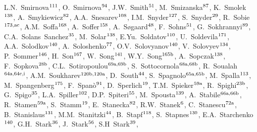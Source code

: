 \begin{flushleft}
L.N.~Smirnova$^\textrm{\scriptsize 111}$,    
O.~Smirnova$^\textrm{\scriptsize 94}$,    
J.W.~Smith$^\textrm{\scriptsize 51}$,    
M.~Smizanska$^\textrm{\scriptsize 87}$,    
K.~Smolek$^\textrm{\scriptsize 138}$,    
A.~Smykiewicz$^\textrm{\scriptsize 82}$,    
A.A.~Snesarev$^\textrm{\scriptsize 108}$,    
I.M.~Snyder$^\textrm{\scriptsize 127}$,    
S.~Snyder$^\textrm{\scriptsize 29}$,    
R.~Sobie$^\textrm{\scriptsize 173,ac}$,    
A.M.~Soffa$^\textrm{\scriptsize 168}$,    
A.~Soffer$^\textrm{\scriptsize 158}$,    
A.~S{\o}gaard$^\textrm{\scriptsize 48}$,    
F.~Sohns$^\textrm{\scriptsize 51}$,    
G.~Sokhrannyi$^\textrm{\scriptsize 89}$,    
C.A.~Solans~Sanchez$^\textrm{\scriptsize 35}$,    
M.~Solar$^\textrm{\scriptsize 138}$,    
E.Yu.~Soldatov$^\textrm{\scriptsize 110}$,    
U.~Soldevila$^\textrm{\scriptsize 171}$,    
A.A.~Solodkov$^\textrm{\scriptsize 140}$,    
A.~Soloshenko$^\textrm{\scriptsize 77}$,    
O.V.~Solovyanov$^\textrm{\scriptsize 140}$,    
V.~Solovyev$^\textrm{\scriptsize 134}$,    
P.~Sommer$^\textrm{\scriptsize 146}$,    
H.~Son$^\textrm{\scriptsize 167}$,    
W.~Song$^\textrm{\scriptsize 141}$,    
W.Y.~Song$^\textrm{\scriptsize 165b}$,    
A.~Sopczak$^\textrm{\scriptsize 138}$,    
F.~Sopkova$^\textrm{\scriptsize 28b}$,    
C.L.~Sotiropoulou$^\textrm{\scriptsize 69a,69b}$,    
S.~Sottocornola$^\textrm{\scriptsize 68a,68b}$,    
R.~Soualah$^\textrm{\scriptsize 64a,64c,i}$,    
A.M.~Soukharev$^\textrm{\scriptsize 120b,120a}$,    
D.~South$^\textrm{\scriptsize 44}$,    
S.~Spagnolo$^\textrm{\scriptsize 65a,65b}$,    
M.~Spalla$^\textrm{\scriptsize 113}$,    
M.~Spangenberg$^\textrm{\scriptsize 175}$,    
F.~Span\`o$^\textrm{\scriptsize 91}$,    
D.~Sperlich$^\textrm{\scriptsize 19}$,    
T.M.~Spieker$^\textrm{\scriptsize 59a}$,    
R.~Spighi$^\textrm{\scriptsize 23b}$,    
G.~Spigo$^\textrm{\scriptsize 35}$,    
L.A.~Spiller$^\textrm{\scriptsize 102}$,    
D.P.~Spiteri$^\textrm{\scriptsize 55}$,    
M.~Spousta$^\textrm{\scriptsize 139}$,    
A.~Stabile$^\textrm{\scriptsize 66a,66b}$,    
R.~Stamen$^\textrm{\scriptsize 59a}$,    
S.~Stamm$^\textrm{\scriptsize 19}$,    
E.~Stanecka$^\textrm{\scriptsize 82}$,    
R.W.~Stanek$^\textrm{\scriptsize 6}$,    
C.~Stanescu$^\textrm{\scriptsize 72a}$,    
B.~Stanislaus$^\textrm{\scriptsize 131}$,    
M.M.~Stanitzki$^\textrm{\scriptsize 44}$,    
B.~Stapf$^\textrm{\scriptsize 118}$,    
S.~Stapnes$^\textrm{\scriptsize 130}$,    
E.A.~Starchenko$^\textrm{\scriptsize 140}$,    
G.H.~Stark$^\textrm{\scriptsize 36}$,    
J.~Stark$^\textrm{\scriptsize 56}$,    
S.H~Stark$^\textrm{\scriptsize 39}$,    

\end{flushleft}
